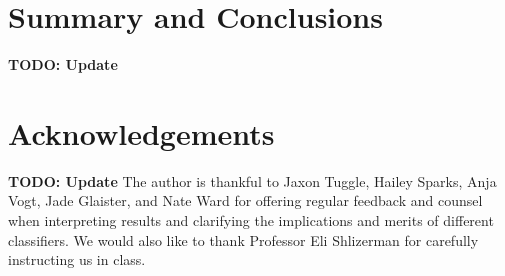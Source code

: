 \documentclass[11pt]{amsart}
\begin{document}

\section{Summary and Conclusions}\label{sec:conclusions} 
\textbf{TODO: Update}

\section*{Acknowledgements}
\textbf{TODO: Update}
The author is thankful to Jaxon Tuggle, Hailey Sparks, Anja Vogt, Jade Glaister, and Nate Ward for offering regular feedback and counsel when interpreting results and clarifying the implications and merits of different classifiers.
We would also like to thank Professor Eli Shlizerman for carefully instructing us in class.


\end{document}
